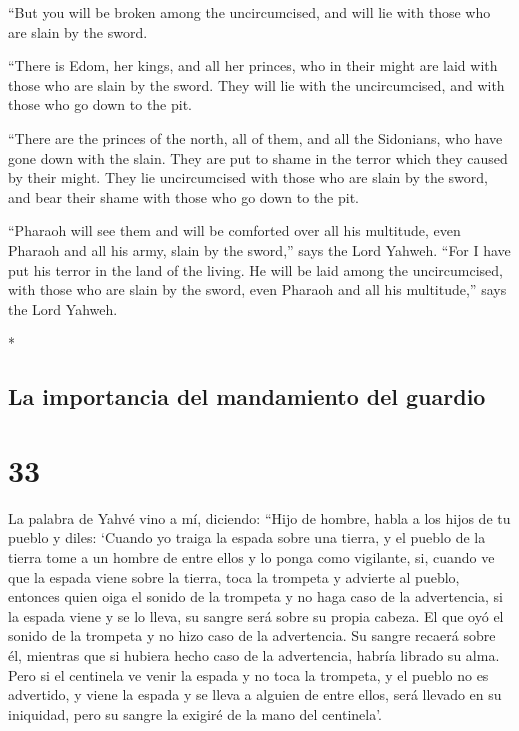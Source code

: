 \begin{paracol}{2}
\begin{otherlanguage}{english}
 ``But you will be broken among the uncircumcised, and
will lie with those who are slain by the sword.

 ``There is Edom, her kings, and all her princes, who in
their might are laid with those who are slain by the sword. They will
lie with the uncircumcised, and with those who go down to the pit.

 ``There are the princes of the north, all of them, and
all the Sidonians, who have gone down with the slain. They are put to
shame in the terror which they caused by their might. They lie
uncircumcised with those who are slain by the sword, and bear their
shame with those who go down to the pit.

 ``Pharaoh will see them and will be comforted over all
his multitude, even Pharaoh and all his army, slain by the sword,'' says
the Lord Yahweh.  ``For I have put his terror in the land
of the living. He will be laid among the uncircumcised, with those who
are slain by the sword, even Pharaoh and all his multitude,'' says the
Lord Yahweh.

\end{otherlanguage}

\switchcolumn[0]*

\hypertarget{la-importancia-del-mandamiento-del-guardio}{%
\subsection{La importancia del mandamiento del
guardio}\label{la-importancia-del-mandamiento-del-guardio}}

\hypertarget{section-64}{%
\section{33}\label{section-64}}

 La palabra de Yahvé vino a mí, diciendo: 
``Hijo de hombre, habla a los hijos de tu pueblo y diles: `Cuando yo
traiga la espada sobre una tierra, y el pueblo de la tierra tome a un
hombre de entre ellos y lo ponga como vigilante,  si,
cuando ve que la espada viene sobre la tierra, toca la trompeta y
advierte al pueblo,  entonces quien oiga el sonido de la
trompeta y no haga caso de la advertencia, si la espada viene y se lo
lleva, su sangre será sobre su propia cabeza.  El que oyó
el sonido de la trompeta y no hizo caso de la advertencia. Su sangre
recaerá sobre él, mientras que si hubiera hecho caso de la advertencia,
habría librado su alma.  Pero si el centinela ve venir la
espada y no toca la trompeta, y el pueblo no es advertido, y viene la
espada y se lleva a alguien de entre ellos, será llevado en su
iniquidad, pero su sangre la exigiré de la mano del centinela'.


\end{paracol}
